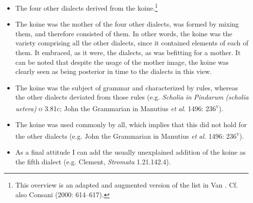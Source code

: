 \documentclass[output=paper]{langsci/langscibook}
\begin{document}
\begin{itemize}
\item \begin{styleListParagraph}
The four other dialects derived from the koine.\footnote{This overview is an adapted and augmented version of the list in Van \citet[209]{Rooy2016b}. Cf. also Consani (2000: 614–617).}
\end{styleListParagraph}
\item \begin{styleListParagraph}
The koine was the mother of the four other dialects, was formed by mixing them, and therefore consisted of them. In other words, the koine was the variety comprising all the other dialects, since it contained elements of each of them. It embraced, as it were, the dialects, as was befitting for a mother. It can be noted that despite the usage of the mother image, the koine was clearly seen as being posterior in time to the dialects in this view.
\end{styleListParagraph}
\item \begin{styleListParagraph}
The koine was the subject of grammar and characterized by rules, whereas the other dialects deviated from those rules (e.g. \textit{Scholia} \textit{in} \textit{Pindarum} \textit{(scholia} \textit{uetera)} \textsc{o} 3.81c; John the Grammarian in Manutius \textit{et} \textit{al.} 1496: 236\textsc{\textsuperscript{v}}).
\end{styleListParagraph}
\item \begin{styleListParagraph}
The koine was used commonly by all, which implies that this did not hold for the other dialects (e.g. John the Grammarian in Manutius \textit{et} \textit{al.} 1496: 236\textsc{\textsuperscript{v}}).
\end{styleListParagraph}
\item \begin{styleListParagraph}
As a final attitude I can add the usually unexplained addition of the koine as the fifth dialect (e.g. Clement, \textit{Stromata} 1.21.142.4).
\end{styleListParagraph}
\end{itemize}
\end{document}
